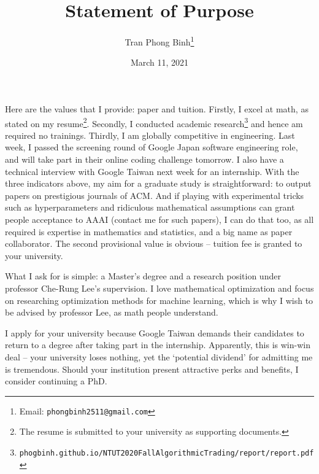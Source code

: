 \documentclass[12pt, letterpaper, oneside]{article}
\title{\textbf{Statement of Purpose}}
\author{Tran Phong Binh\thanks{Email: \texttt{phongbinh2511@gmail.com}}}
\date{March 11, 2021}
\begin{document}
\maketitle

Here are the values that I provide: paper and tuition. Firstly, I excel at math, as stated on my resume\footnote{The resume is submitted to your university as supporting documents.}. Secondly, I conducted academic research\footnote{\texttt{phogbinh.github.io/NTUT2020FallAlgorithmicTrading/report/report.pdf}} and hence am required no trainings. Thirdly, I am globally competitive in engineering. Last week, I passed the screening round of Google Japan software engineering role, and will take part in their online coding challenge tomorrow. I also have a technical interview with Google Taiwan next week for an internship. With the three indicators above, my aim for a graduate study is straightforward: to output papers on prestigious journals of ACM. And if playing with experimental tricks such as hyperparameters and ridiculous mathematical assumptions can grant people acceptance to AAAI (contact me for such papers), I can do that too, as all required is expertise in mathematics and statistics, and a big name as paper collaborator. The second provisional value is obvious -- tuition fee is granted to your university.

What I ask for is simple: a Master's degree and a research position under professor Che-Rung Lee's supervision. I love mathematical optimization and focus on researching optimization methods for machine learning, which is why I wish to be advised by professor Lee, as math people understand.

I apply for your university because Google Taiwan demands their candidates to return to a degree after taking part in the internship. Apparently, this is win-win deal -- your university loses nothing, yet the `potential dividend' for admitting me is tremendous. Should your institution present attractive perks and benefits, I consider continuing a PhD.
\end{document}
